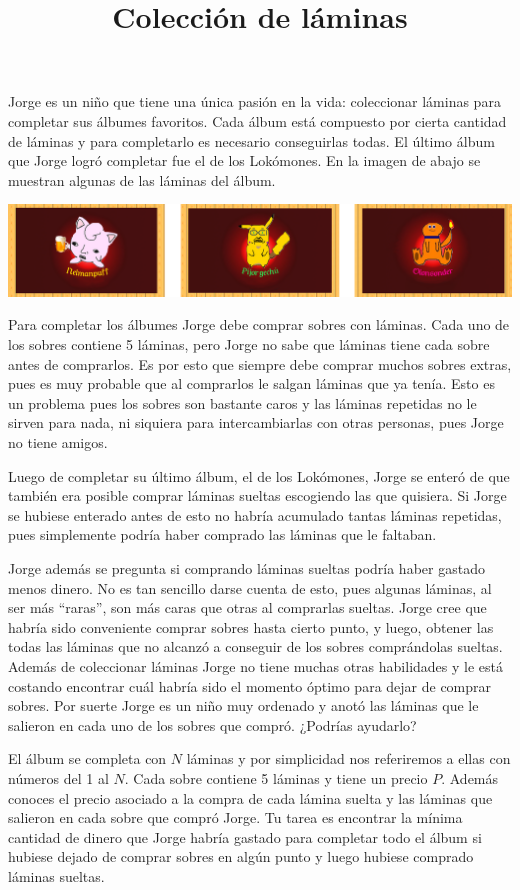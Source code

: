 \documentclass{oci}
\title{Colección de láminas}
\begin{document}
\begin{problemDescription}
Jorge es un niño que tiene una única pasión en la vida: coleccionar láminas
para completar sus álbumes favoritos. Cada álbum está compuesto por cierta
cantidad de láminas y para completarlo es necesario conseguirlas todas. El
último álbum que Jorge logró completar fue el de los Lokómones. En la imagen de
abajo se muestran algunas de las láminas del álbum.

\begin{center}
\includegraphics[scale=0.5]{locomons-laminas.png}
\end{center}

Para completar los álbumes Jorge debe comprar sobres con láminas. Cada uno de
los sobres contiene 5 láminas, pero Jorge no sabe que láminas tiene cada sobre
antes de comprarlos. Es por esto que siempre debe comprar muchos sobres extras,
pues es muy probable que al comprarlos le salgan láminas que ya tenía. Esto es
un problema pues los sobres son bastante caros y las láminas repetidas no le
sirven para nada, ni siquiera para intercambiarlas con otras personas, pues
Jorge no tiene amigos.

Luego de completar su último álbum, el de los Lokómones, Jorge se enteró de que
también era posible comprar láminas sueltas escogiendo las que quisiera. Si
Jorge se hubiese enterado antes de esto no habría acumulado tantas láminas
repetidas, pues simplemente podría haber comprado las láminas que le faltaban.

Jorge además se pregunta si comprando láminas sueltas podría haber gastado
menos dinero. No es tan sencillo darse cuenta de esto, pues algunas láminas, al
ser más ``raras'', son más caras que otras al comprarlas sueltas. Jorge cree
que habría sido conveniente comprar sobres hasta cierto punto, y luego, obtener
las todas las láminas que no alcanzó a conseguir de los sobres comprándolas
sueltas. Además de coleccionar láminas Jorge no tiene muchas otras habilidades
y le está costando encontrar cuál habría sido el momento óptimo para dejar de
comprar sobres. Por suerte Jorge es un niño muy ordenado y anotó las láminas
que le salieron en cada uno de los sobres que compró. ¿Podrías ayudarlo?

El álbum se completa con $N$ láminas y por simplicidad nos referiremos a ellas
con números del 1 al $N$. Cada sobre contiene 5 láminas y tiene un precio $P$.
Además conoces el precio asociado a la compra de cada lámina suelta y las
láminas que salieron en cada sobre que compró Jorge. Tu tarea es encontrar la
mínima cantidad de dinero que Jorge habría gastado para completar todo el álbum
si hubiese dejado de comprar sobres en algún punto y luego hubiese comprado
láminas sueltas.
\end{problemDescription}
\end{document}
